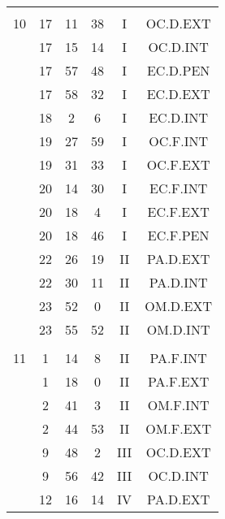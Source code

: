 \documentclass[12pt, a4paper]{article}
\begin{document}
\begin{multicols}{3}
{\begin{tabular}{c c c c c c}
	 	 	 	 & & & & & \\%
	 	 	 	10 & 17 & 11 & 38 & I & OC.D.EXT\\%
	 	 	 	 & 17 & 15 & 14 & I & OC.D.INT\\%
	 	 	 	 & 17 & 57 & 48 & I & EC.D.PEN\\%
	 	 	 	 & 17 & 58 & 32 & I & EC.D.EXT\\%
	 	 	 	 & 18 & 2 & 6 & I & EC.D.INT\\%
	 	 	 	 & 19 & 27 & 59 & I & OC.F.INT\\%
	 	 	 	 & 19 & 31 & 33 & I & OC.F.EXT\\%
	 	 	 	 & 20 & 14 & 30 & I & EC.F.INT\\%
	 	 	 	 & 20 & 18 & 4 & I & EC.F.EXT\\%
	 	 	 	 & 20 & 18 & 46 & I & EC.F.PEN\\%
	 	 	 	 & 22 & 26 & 19 & II & PA.D.EXT\\%
	 	 	 	 & 22 & 30 & 11 & II & PA.D.INT\\%
	 	 	 	 & 23 & 52 & 0 & II & OM.D.EXT\\%
	 	 	 	 & 23 & 55 & 52 & II & OM.D.INT\\%
	 	 	 	 & & & & & \\%
	 	 	 	11 & 1 & 14 & 8 & II & PA.F.INT\\%
	 	 	 	 & 1 & 18 & 0 & II & PA.F.EXT\\%
	 	 	 	 & 2 & 41 & 3 & II & OM.F.INT\\%
	 	 	 	 & 2 & 44 & 53 & II & OM.F.EXT\\%
	 	 	 	 & 9 & 48 & 2 & III & OC.D.EXT\\%
	 	 	 	 & 9 & 56 & 42 & III & OC.D.INT\\%
	 	 	 	 & 12 & 16 & 14 & IV & PA.D.EXT\\%

\end{tabular}}
\end{multicols}
\end{document}
